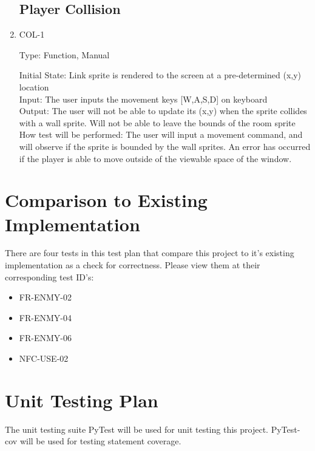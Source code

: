 \documentclass[12pt, titlepage]{article}
\begin{document}
\begin{enumerate}
	
	\subsection{Player Collision}
	
	\item{COL-1\\}
	
	Type: Function, Manual
	
	Initial State: Link sprite is rendered to the screen at a pre-determined (x,y) location \\
	
	Input: The user inputs the movement keys [W,A,S,D] on keyboard\\
	
	Output: The user will not be able to update its (x,y) when the sprite collides with a wall sprite. Will not be able to leave the bounds of the room sprite\\
	
	How test will be performed: The user will input a movement command, and will observe if the sprite is bounded by the wall sprites. An error has occurred if the player is able to move outside of the viewable space of the window.
\end{enumerate}

	
\section{Comparison to Existing Implementation}	

There are four tests in this test plan that compare this project to it's existing implementation as a check for correctness. Please view them at their corresponding test ID's:

\begin{itemize}
	\item FR-ENMY-02
	\item FR-ENMY-04
	\item FR-ENMY-06
	\item NFC-USE-02
\end{itemize}
				
\section{Unit Testing Plan}

The unit testing suite PyTest will be used for unit testing this project.
PyTest-cov will be used for testing statement coverage.
\end{document}
